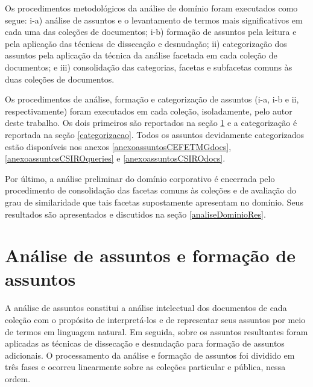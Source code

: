 




Os procedimentos metodológicos da análise de domínio foram executados como segue: i-a) análise de assuntos e o levantamento de termos mais significativos em cada uma das coleções de documentos; i-b) formação de assuntos pela leitura e pela aplicação das técnicas de dissecação e desnudação; ii) categorização dos assuntos pela aplicação da técnica da análise facetada em cada coleção de documentos; e iii) consolidação das categorias, facetas e subfacetas comuns às duas coleções de documentos.

Os procedimentos de análise, formação e categorização de assuntos (i-a, i-b e ii, respectivamente) foram executados em cada coleção, isoladamente, pelo autor deste trabalho. Os dois primeiros são reportados na seção \ref{analiseFormacaoDeAssuntos} e a categorização é reportada na seção \ref{categorizacao}. Todos os assuntos devidamente categorizados estão disponíveis nos anexos \ref{anexoassuntosCEFETMGdocs}, \ref{anexoassuntosCSIROqueries} e \ref{anexoassuntosCSIROdocs}.

Por último, a análise preliminar do domínio corporativo é encerrada pelo procedimento de consolidação das facetas comuns às coleções e de avaliação do grau de similaridade que tais facetas supostamente apresentam no domínio. Seus resultados são apresentados e discutidos na seção \ref{analiseDominioRes}.


\section{Análise de assuntos e formação de assuntos}
\label{analiseFormacaoDeAssuntos}

A análise de assuntos constitui a análise intelectual dos documentos de cada coleção com o propósito de interpretá-los e de representar seus assuntos por meio de termos em linguagem natural. Em seguida, sobre os assuntos resultantes foram aplicadas as técnicas de dissecação e desnudação para formação de assuntos adicionais. O processamento da análise e formação de assuntos foi dividido em três fases e ocorreu linearmente sobre as coleções particular e pública, nessa ordem.

